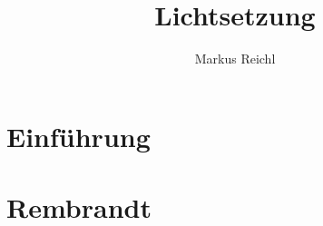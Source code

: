 \documentclass{school}
\title{Lichtsetzung}
\author{Markus Reichl}
\begin{document}
\maketitle
\thispagestyle{fancy}

\section{Einführung}

\section{Rembrandt}

\end{document}
